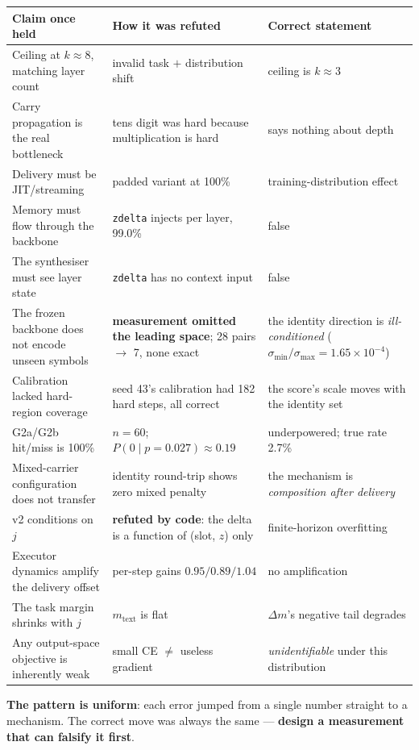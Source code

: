\documentclass[11pt, a4paper]{article}
\newcommand{\dm}{\Delta m}
\newcommand{\mtext}{m_{\mathrm{text}}}
\begin{document}
\begin{longtable}{p{} p{} p{}}
\toprule
\textbf{Claim once held} & \textbf{How it was refuted} & \textbf{Correct statement} \\
\midrule
\endhead
Ceiling at $k \approx 8$, matching layer count & invalid task $+$ distribution shift & ceiling is $k \approx 3$ \\
Carry propagation is the real bottleneck & tens digit was hard because multiplication is hard & says nothing about depth \\
Delivery must be JIT/streaming & padded variant at 100\% & training-distribution effect \\
Memory must flow through the backbone & \verb|zdelta| injects per layer, 99.0\% & false \\
The synthesiser must see layer state & \verb|zdelta| has no context input & false \\
The frozen backbone does not encode unseen symbols & \textbf{measurement omitted the leading space}; 28 pairs $\to$ 7, none exact & the identity direction is \emph{ill-conditioned} ($\sigma_{\min}/\sigma_{\max} = 1.65\times10^{-4}$) \\
Calibration lacked hard-region coverage & seed 43's calibration had 182 hard steps, all correct & the score's scale moves with the identity set \\
G2a/G2b hit/miss is 100\% & $n{=}60$; $P(0 \mid p{=}0.027) \approx 0.19$ & underpowered; true rate 2.7\% \\
Mixed-carrier configuration does not transfer & identity round-trip shows zero mixed penalty & the mechanism is \emph{composition after delivery} \\
v2 conditions on $j$ & \textbf{refuted by code}: the delta is a function of (slot, $z$) only & finite-horizon overfitting \\
Executor dynamics amplify the delivery offset & per-step gains $0.95 / 0.89 / 1.04$ & no amplification \\
The task margin shrinks with $j$ & $\mtext$ is flat & $\dm$'s negative tail degrades \\
Any output-space objective is inherently weak & small CE $\ne$ useless gradient & \emph{unidentifiable} under this distribution \\
\bottomrule
\end{longtable}

\noindent
\textbf{The pattern is uniform}: each error jumped from a single number straight to a
mechanism. The correct move was always the same --- \textbf{design a measurement that can
falsify it first}.
\end{document}
